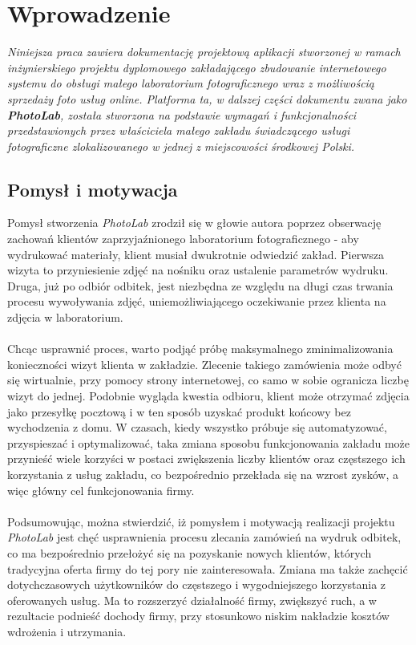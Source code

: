 \chapter{Wprowadzenie} \label{rozdz.Wprowadzenie} 
{\em \quad Niniejsza praca zawiera dokumentację projektową aplikacji stworzonej w ramach inżynierskiego projektu dyplomowego zakładającego zbudowanie internetowego systemu do obsługi małego laboratorium fotograficznego wraz z możliwością sprzedaży foto usług online. Platforma ta, w dalszej części dokumentu zwana jako \textbf{PhotoLab}, została stworzona na podstawie wymagań i funkcjonalności przedstawionych przez właściciela małego zakładu świadczącego usługi fotograficzne zlokalizowanego w jednej z miejscowości środkowej Polski.
}

\section{Pomysł i motywacja}
\quad Pomysł stworzenia \textit{PhotoLab} zrodził się w głowie autora poprzez obserwację zachowań klientów zaprzyjaźnionego laboratorium fotograficznego - aby wydrukować materiały, klient musiał dwukrotnie odwiedzić zakład. Pierwsza wizyta to przyniesienie zdjęć na nośniku oraz ustalenie parametrów wydruku. Druga, już po odbiór odbitek, jest niezbędna ze względu na długi czas trwania procesu wywoływania zdjęć, uniemożliwiającego oczekiwanie przez klienta na zdjęcia w laboratorium.\\
\\
Chcąc usprawnić proces, warto podjąć próbę maksymalnego zminimalizowania konieczności wizyt klienta w zakładzie. Zlecenie takiego zamówienia może odbyć się wirtualnie, przy pomocy strony internetowej, co samo w sobie ogranicza liczbę wizyt do jednej. Podobnie wygląda kwestia odbioru, klient może otrzymać zdjęcia jako przesyłkę pocztową i w ten sposób uzyskać produkt końcowy bez wychodzenia z domu. W czasach, kiedy wszystko próbuje się automatyzować, przyspieszać i optymalizować, taka zmiana sposobu funkcjonowania zakładu może przynieść wiele korzyści w postaci zwiększenia liczby klientów oraz częstszego ich korzystania z usług zakładu, co bezpośrednio przekłada się na wzrost zysków, a więc główny cel funkcjonowania firmy. \\
\\
Podsumowując, można stwierdzić, iż pomysłem i motywacją realizacji projektu \textit{PhotoLab} jest chęć usprawnienia procesu zlecania zamówień na wydruk odbitek, co ma bezpośrednio przełożyć się na pozyskanie nowych klientów, których tradycyjna oferta firmy do tej pory nie zainteresowała. Zmiana ma także zachęcić dotychczasowych użytkowników do częstszego i wygodniejszego korzystania z oferowanych usług. Ma to rozszerzyć działalność firmy, zwiększyć ruch, a w rezultacie podnieść dochody firmy, przy stosunkowo niskim nakładzie kosztów wdrożenia i utrzymania.
\newpage

